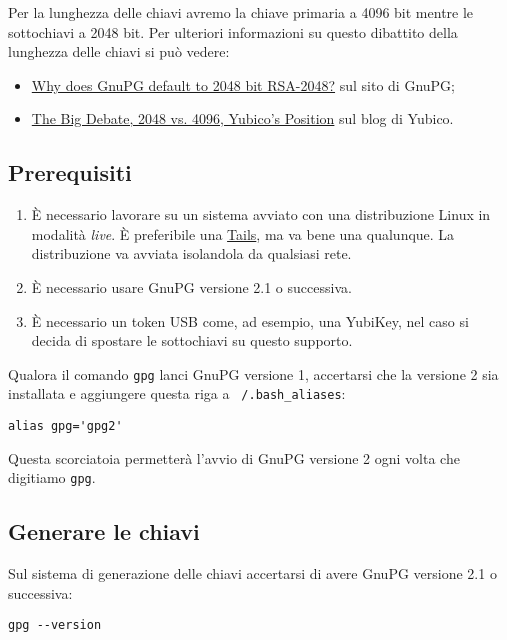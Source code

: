\documentclass[a4paper,10pt]{article}
\begin{document}
Per la lunghezza delle chiavi avremo la chiave primaria a 4096 bit mentre le sottochiavi a 2048 bit. Per ulteriori informazioni su questo dibattito della lunghezza delle chiavi si può vedere:

\begin{itemize}
 \item \href{https://www.gnupg.org/faq/gnupg-faq.html#default_rsa2048}{Why does GnuPG default to 2048 bit RSA-2048?} sul sito di GnuPG;
 \item \href{https://www.yubico.com/2015/02/big-debate-2048-4096-yubicos-stand/}{The Big Debate, 2048 vs. 4096, Yubico’s Position} sul blog di Yubico.
\end{itemize}

\subsection{Prerequisiti}

\begin{enumerate}
 \item È necessario lavorare su un sistema avviato con una distribuzione Linux in modalità \textit{live}. È preferibile una \href{https://tails.boum.org/index.it.html}{Tails}, ma va bene una qualunque. La distribuzione va avviata isolandola da qualsiasi rete.
 \item È necessario usare GnuPG versione 2.1 o successiva.
 \item È necessario un token USB come, ad esempio, una YubiKey, nel caso si decida di spostare le sottochiavi su questo supporto.
\end{enumerate}

Qualora il comando \texttt{gpg} lanci GnuPG versione 1, accertarsi che la versione 2 sia installata e aggiungere questa riga a \texttt{~/.bash\_aliases}:

\begin{verbatim}
alias gpg='gpg2'
\end{verbatim}

Questa scorciatoia permetterà l'avvio di GnuPG versione 2 ogni volta che digitiamo \texttt{gpg}.

\subsection{Generare le chiavi}

Sul sistema di generazione delle chiavi accertarsi di avere GnuPG versione 2.1 o successiva:

\begin{verbatim}
gpg --version
\end{verbatim}
\end{document}
